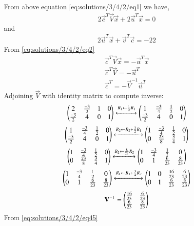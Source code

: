 From above equation \eqref{eq:solutions/3/4/2/eq1} we have,
\begin{align}\label{eq:solutions/3/4/2/eq2}
2\vec{c}^T\vec{V}\vec{x}+2\vec{u}^T\vec{x}=0
\end{align}
and
\begin{align}
2\vec{u}^T\vec{x}+\vec{v}^T\vec{c}=-22
\end{align}
From \eqref{eq:solutions/3/4/2/eq2}
\begin{align}
\vec{c}^T\vec{V}\vec{x}= -\vec{u}^T\vec{x}\\
\vec{c}^T\vec{V}= -\vec{u}^T\\
\vec{c}^T= -\vec{V}^{-1}\vec{u}^T \label{eq:solutions/3/4/2/eq45}
\end{align}
 Adjoining  $\vec V$ with identity matrix to compute inverse:
\begin{align}
\begin{pmatrix}
2 &  \frac{-3}{2} &1 &0\\
 \frac{-3}{2} &4 & 0&1
\end{pmatrix}
  \xleftrightarrow[]{R_1 \leftarrow  \frac{1}{2}R_1}
\begin{pmatrix}
1& \frac{-3}{4}&  \frac{1}{2}  &0\\
 \frac{-3}{2} &4 & 0 &1
\end{pmatrix}
\end{align}
\begin{align}
\begin{pmatrix}
1& \frac{-3}{4}&  \frac{1}{2}  &0\\
 \frac{-3}{2} &4 & 0 &1
\end{pmatrix}
  \xleftrightarrow[]{R_2 \leftarrow R_2+\frac{3}{2} R_1}
\begin{pmatrix}
1& \frac{-3}{4}& \frac{1}{2} &0\\
0 & \frac{23}{8} & \frac{3}{4} & 1\end{pmatrix}
\end{align}
\begin{align}
\begin{pmatrix}
1& \frac{-3}{4}& \frac{1}{2} &0\\
0 & \frac{23}{8} & \frac{3}{4} & 1\end{pmatrix}
  \xleftrightarrow[]{R_2 \leftarrow\frac{8}{23}  R_2}
\begin{pmatrix}
1& \frac{-3}{4}& \frac{1}{2} &0\\
0 & 1 & \frac{6}{23} &\frac{8}{23} \end{pmatrix}
\end{align}
\begin{align}
\begin{pmatrix}
1& \frac{-3}{4}& \frac{1}{2} &0\\
0 & 1 & \frac{6}{23} &\frac{8}{23} \end{pmatrix}
  \xleftrightarrow[]{R_1 \leftarrow R_1+\frac{3}{4}R_2}
\begin{pmatrix}
1& 0& \frac{16}{23} &\frac{6}{23}\\
0 & 1 & \frac{6}{23} &\frac{8}{23} \end{pmatrix}
\end{align}
\begin{align}
\mathbf V^{-1}=
\begin{pmatrix}
\frac{16}{23} & \frac{6}{23}\\
\frac{6}{23}&\frac{8}{23}\end{pmatrix}
\end{align}
From \eqref{eq:solutions/3/4/2/eq45}
